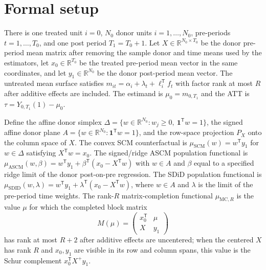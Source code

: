 \documentclass[11pt]{article}
\newcommand{\one}{\mathbf{1}}
\newcommand{\transpose}{\mathsf{T}}
\newcommand{\R}{\mathbb{R}}
\theoremstyle{definition}
\theoremstyle{plain}
\theoremstyle{remark}
\begin{document}
\section{Formal setup}\label{sec:setup}
There is one treated unit $i=0$, $N_0$ donor units $i=1,\ldots,N_0$, pre-periods
$t=1,\ldots,T_0$, and one post period $T_1=T_0+1$. Let
$X\in\R^{N_0\times T_0}$ be the donor pre-period mean matrix after removing the
sample donor and time means used by the estimators, let $x_0\in\R^{T_0}$ be the
treated pre-period mean vector in the same coordinates, and let
$y_1\in\R^{N_0}$ be the donor post-period mean vector. The untreated mean
surface satisfies $m_{it}=\alpha_i+\lambda_t+\ell_i^{\transpose}f_t$ with
factor rank at most $R$ after additive effects are included. The estimand is
$\mu_0=m_{0,T_1}$ and the ATT is $\tau=Y_{0,T_1}(1)-\mu_0$.

Define the affine donor simplex
$\Delta=\{w\in\R^{N_0}: w_j\ge 0,\ \one^{\transpose}w=1\}$, the signed affine
donor plane $A=\{w\in\R^{N_0}:\one^{\transpose}w=1\}$, and the row-space
projection $P_X$ onto the column space of $X$. The convex SCM counterfactual is
$\mu_{\mathrm{SCM}}(w)=w^{\transpose}y_1$ for $w\in\Delta$ satisfying
$X^{\transpose}w=x_0$. The signed/ridge ASCM population functional is
$\mu_{\mathrm{ASCM}}(w,\beta)=w^{\transpose}y_1+\beta^{\transpose}
(x_0-X^{\transpose}w)$ with $w\in A$ and $\beta$ equal to a specified ridge
limit of the donor post-on-pre regression. The SDiD population functional is
$\mu_{\mathrm{SDID}}(w,\lambda)=w^{\transpose}y_1+\lambda^{\transpose}
(x_0-X^{\transpose}w)$, where $w\in A$ and $\lambda$ is the limit of the
pre-period time weights. The rank-$R$ matrix-completion functional
$\mu_{\mathrm{MC},R}$ is the value $\mu$ for which the completed block matrix
\[
M(\mu)=
\begin{pmatrix}
x_0^{\transpose} & \mu\\
X & y_1
\end{pmatrix}
\]
has rank at most $R+2$ after additive effects are uncentered; when the centered
$X$ has rank $R$ and $x_0,y_1$ are visible in its row and column spans, this
value is the Schur complement $x_0^{\transpose}X^{+}y_1$.
\end{document}
